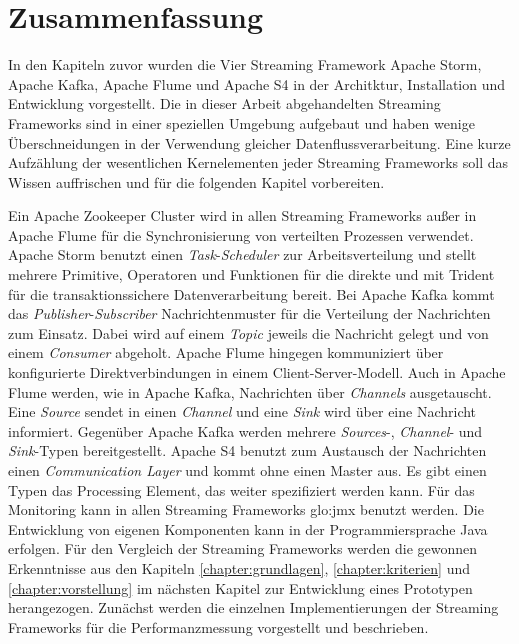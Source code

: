 \section{Zusammenfassung}

In den Kapiteln zuvor wurden die Vier Streaming Framework Apache Storm, Apache Kafka, Apache Flume und Apache S4 in der Architktur, Installation und Entwicklung vorgestellt. Die in dieser Arbeit abgehandelten Streaming Frameworks sind in einer speziellen Umgebung aufgebaut und haben wenige Überschneidungen in der Verwendung gleicher Datenflussverarbeitung. Eine kurze Aufzählung der wesentlichen Kernelementen jeder Streaming Frameworks soll das Wissen auffrischen und für die folgenden Kapitel vorbereiten.

Ein Apache Zookeeper Cluster wird in allen Streaming Frameworks außer in Apache Flume für die Synchronisierung von verteilten Prozessen verwendet. 
Apache Storm benutzt einen \textit{Task}-\textit{Scheduler} zur Arbeitsverteilung und stellt mehrere Primitive, Operatoren und Funktionen für die direkte und mit Trident für die transaktionssichere Datenverarbeitung bereit. Bei Apache Kafka kommt das \textit{Publisher}-\textit{Subscriber} Nachrichtenmuster für die Verteilung der Nachrichten zum Einsatz. Dabei wird auf einem \textit{Topic} jeweils die Nachricht gelegt und von einem \textit{Consumer} abgeholt. Apache Flume hingegen kommuniziert über konfigurierte Direktverbindungen in einem Client-Server-Modell. Auch in Apache Flume werden, wie in Apache Kafka, Nachrichten über \textit{Channels} ausgetauscht. Eine \textit{Source} sendet in einen \textit{Channel} und eine \textit{Sink} wird über eine Nachricht informiert. Gegenüber Apache Kafka werden mehrere \textit{Sources}-, \textit{Channel}- und \textit{Sink}-Typen bereitgestellt. Apache S4 benutzt zum Austausch der Nachrichten einen \textit{Communication Layer} und kommt ohne einen Master aus. Es gibt einen Typen das Processing Element, das weiter spezifiziert werden kann. Für das Monitoring kann in allen Streaming Frameworks \gls{glo:jmx} benutzt werden. Die Entwicklung von eigenen Komponenten kann in der Programmiersprache Java erfolgen. Für den Vergleich der Streaming Frameworks werden die gewonnen Erkenntnisse aus den Kapiteln \ref{chapter:grundlagen}, \ref{chapter:kriterien} und \ref{chapter:vorstellung} im nächsten Kapitel zur Entwicklung eines Prototypen herangezogen. Zunächst werden die einzelnen Implementierungen der Streaming Frameworks für die Performanzmessung vorgestellt und beschrieben.